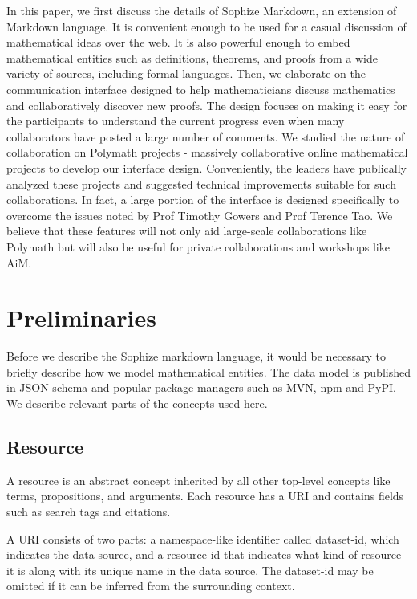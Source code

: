 \documentclass[a4paper]{article}
\begin{document}
In this paper, we first discuss the details of Sophize Markdown, an extension of Markdown language. It is convenient enough to be used for a casual discussion of mathematical ideas over the web. It is also powerful enough to embed mathematical entities such as definitions, theorems, and proofs from a wide variety of sources, including formal languages. Then, we elaborate on the communication interface designed to help mathematicians discuss mathematics and collaboratively discover new proofs. The design focuses on making it easy for the participants to understand the current progress even when many collaborators have posted a large number of comments. We studied the nature of collaboration on Polymath projects\cite{polymath_blog} - massively collaborative online mathematical projects to develop our interface design. Conveniently, the leaders have publically analyzed these projects and suggested technical improvements suitable for such collaborations. In fact, a large portion of the interface is designed specifically to overcome the issues noted by Prof Timothy Gowers \cite{gowers_weblog_2009} and Prof Terence Tao\cite{whats_new_2009}. We believe that these features will not only aid large-scale collaborations like Polymath but will also be useful for private collaborations and workshops like AiM.



\section{Preliminaries}


Before we describe the Sophize markdown language, it would be necessary to briefly describe how we model mathematical entities. The data model is published in JSON schema\cite{sophize_datamodel} and popular package managers such as MVN, npm and PyPI. We describe relevant parts of the concepts used here.


\subsection*{Resource}

A resource is an abstract concept inherited by all other top-level concepts like terms, propositions, and arguments. Each resource has a URI and contains fields such as search tags and citations.


A URI consists of two parts: a namespace-like identifier called dataset-id, which indicates the data source, and a resource-id that indicates what kind of resource it is along with its unique name in the data source. The dataset-id may be omitted if it can be inferred from the surrounding context.
\end{document}
